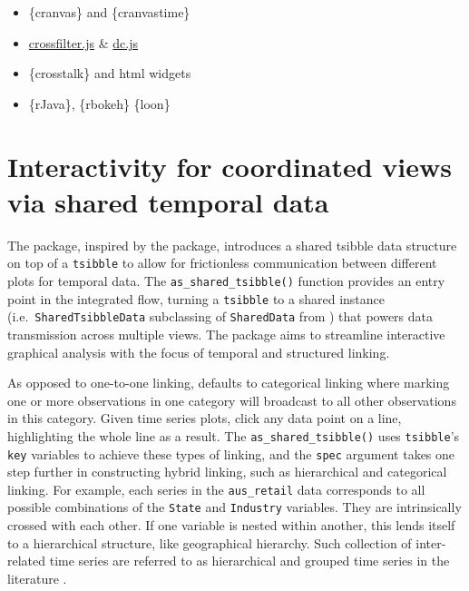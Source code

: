 \begin{itemize}
\tightlist
\item
  \{cranvas\} and \{cranvastime\}
\item
  \href{http://crossfilter.github.io/crossfilter/}{crossfilter.js} \&
  \href{https://dc-js.github.io/dc.js/}{dc.js}
\item
  \{crosstalk\} and html widgets
\item
  \{rJava\}, \{rbokeh\} \{loon\}
\end{itemize}

\hypertarget{interactivity-for-coordinated-views-via-shared-temporal-data}{%
\section{Interactivity for coordinated views via shared temporal
data}\label{interactivity-for-coordinated-views-via-shared-temporal-data}}

The  package, inspired by the 
package, introduces a shared tsibble data structure on top of a
\texttt{tsibble} to allow for frictionless communication between
different plots for temporal data. The \texttt{as\_shared\_tsibble()}
function provides an entry point in the integrated flow, turning a
\texttt{tsibble} to a shared instance (i.e.~\texttt{SharedTsibbleData}
subclassing of \texttt{SharedData} from ) that powers
data transmission across multiple views. The 
package aims to streamline interactive graphical analysis with the focus
of temporal and structured linking.

As opposed to one-to-one linking,  defaults to
categorical linking where marking one or more observations in one
category will broadcast to all other observations in this category.
Given time series plots, click any data point on a line, highlighting
the whole line as a result. The \texttt{as\_shared\_tsibble()} uses
\texttt{tsibble}'s \texttt{key} variables to achieve these types of
linking, and the \texttt{spec} argument takes one step further in
constructing hybrid linking, such as hierarchical and categorical
linking. For example, each series in the \texttt{aus\_retail} data
corresponds to all possible combinations of the \texttt{State} and
\texttt{Industry} variables. They are intrinsically crossed with each
other. If one variable is nested within another, this lends itself to a
hierarchical structure, like geographical hierarchy. Such collection of
inter-related time series are referred to as hierarchical and grouped
time series in the literature \citep{fpp}.

